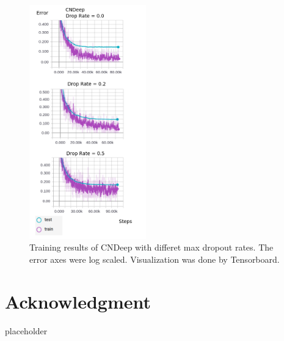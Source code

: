 \documentclass[conference]{IEEEtran}
\begin{document}
\begin{figure}[htbp]
\centerline{\includegraphics[width=0.45\textwidth]{result2.png}}
\caption{Training results of CNDeep with differet max dropout rates. The error axes were log scaled. Visualization was done by Tensorboard.}
\label{fig4}
\end{figure}

\section*{Acknowledgment}

placeholder
\end{document}
